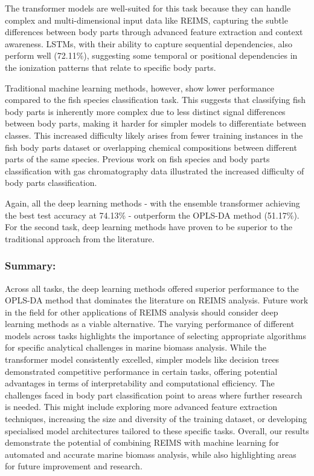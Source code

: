 The transformer models are well-suited for this task because they can handle complex and multi-dimensional input data like REIMS, capturing the subtle differences between body parts through advanced feature extraction and context awareness. LSTMs, with their ability to capture sequential dependencies, also perform well (72.11\%), suggesting some temporal or positional dependencies in the ionization patterns that relate to specific body parts.

Traditional machine learning methods, however, show lower performance compared to the fish species classification task. This suggests that classifying fish body parts is inherently more complex due to less distinct signal differences between body parts, making it harder for simpler models to differentiate between classes. 
This increased difficulty likely arises from fewer training instances in the fish body parts dataset or overlapping chemical compositions between different parts of the same species.
Previous work \citep{Wood2022} on fish species and body parts classification with gas chromatography data illustrated the increased difficulty of body parts classification.

Again, all the deep learning methods - with the ensemble transformer achieving the best test accuracy at 74.13\% - outperform the OPLS-DA method (51.17\%). For the second task, deep learning methods have proven to be superior to the traditional approach from the literature.

\subsubsection{Summary:}

Across all tasks, the deep learning methods offered superior performance to the OPLS-DA method that dominates the literature \citep{Balog2010,Jha2015,Black2017,Black2019} on REIMS analysis. Future work in the field for other applications of REIMS analysis should consider deep learning methods as a viable alternative.
The varying performance of different models across tasks highlights the importance of selecting appropriate algorithms for specific analytical challenges in marine biomass analysis. 
While the transformer model consistently excelled, simpler models like decision trees demonstrated competitive performance in certain tasks, offering potential advantages in terms of interpretability and computational efficiency.
The challenges faced in body part classification point to areas where further research is needed. This might include exploring more advanced feature extraction techniques, increasing the size and diversity of the training dataset, or developing specialised model architectures tailored to these specific tasks.
Overall, our results demonstrate the potential of combining REIMS with machine learning for automated and accurate marine biomass analysis, while also highlighting areas for future improvement and research.


